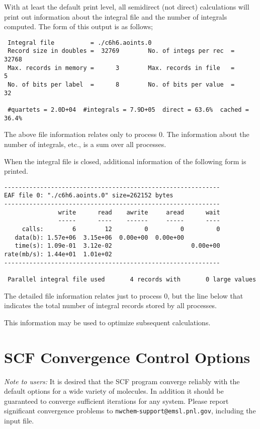 With at least the default print level, all semidirect (not direct)
calculations will print out information about the integral file and
the number of integrals computed.  The form of this output is as
follows;

\begin{verbatim}
 Integral file          = ./c6h6.aoints.0
 Record size in doubles =  32769        No. of integs per rec  =  32768
 Max. records in memory =      3        Max. records in file   =      5
 No. of bits per label  =      8        No. of bits per value  =     32

 #quartets = 2.0D+04  #integrals = 7.9D+05  direct = 63.6%  cached = 36.4%
\end{verbatim}

The above file information relates only to process 0.  The information
about the number of integrals, etc., is a sum over all processes.

When the integral file is closed, additional information of the following
form is printed.

\begin{verbatim}
------------------------------------------------------------
EAF file 0: "./c6h6.aoints.0" size=262152 bytes
------------------------------------------------------------
               write      read    awrite     aread      wait
               -----      ----    ------     -----      ----
     calls:        6        12         0         0         0
   data(b): 1.57e+06  3.15e+06  0.00e+00  0.00e+00
   time(s): 1.09e-01  3.12e-02                      0.00e+00
rate(mb/s): 1.44e+01  1.01e+02
------------------------------------------------------------

 Parallel integral file used       4 records with       0 large values
\end{verbatim}
The detailed file information relates just to process 0, but the 
line below that indicates the total number of integral records stored
by all processes.  

This information may be used to optimize subsequent calculations.


\section{SCF Convergence Control Options}
\label{sec:scfconv}

{\em Note to users:} It is desired that the SCF program converge
reliably with the default options for a wide variety of molecules.  In
addition it should be guaranteed to converge sufficient iterations for
any system.  Please report significant convergence problems to
\verb+nwchem+-\verb+support@+\-\verb+emsl.pnl.gov+, including the
input file. 

